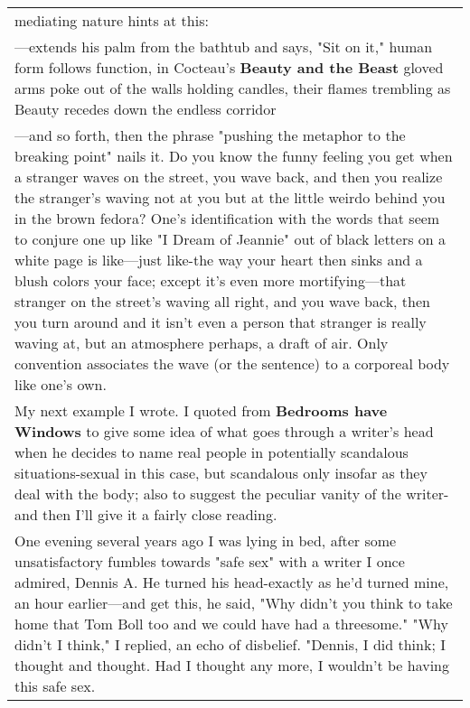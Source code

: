 \begin{longtable}[]{@{}l@{}}
\begin{minipage}[t]{0.97\columnwidth}
mediating nature hints at this:\strut
\end{minipage}\tabularnewline
\begin{minipage}[t]{0.97\columnwidth}\raggedright
---extends his palm from the bathtub and says, "Sit on it," human form
follows function, in Cocteau's \textbf{Beauty and the Beast} gloved arms
poke out of the walls holding candles, their flames trembling as Beauty
recedes down the endless corridor\strut
\end{minipage}\tabularnewline
\begin{minipage}[t]{0.97\columnwidth}\raggedright
---and so forth, then the phrase "pushing the metaphor to the breaking
point" nails it. Do you know the funny feeling you get when a stranger
waves on the street, you wave back, and then you realize the stranger's
waving not at you but at the little weirdo behind you in the brown
fedora? One's identification with the words that seem to conjure one up
like "I Dream of Jeannie" out of black letters on a white page is
like---just like-the way your heart then sinks and a blush colors your
face; except it's even more mortifying---that stranger on the street's
waving all right, and you wave back, then you turn around and it isn't
even a person that stranger is really waving at, but an atmosphere
perhaps, a draft of air. Only convention associates the wave (or the
sentence) to a corporeal body like one's own.\strut
\end{minipage}\tabularnewline
\begin{minipage}[t]{0.97\columnwidth}\raggedright
My next example I wrote. I quoted from \textbf{Bedrooms have Windows} to
give some idea of what goes through a writer's head when he decides to
name real people in potentially scandalous situations-sexual in this
case, but scandalous only insofar as they deal with the body; also to
suggest the peculiar vanity of the writer-and then I'll give it a fairly
close reading.\strut
\end{minipage}\tabularnewline
\begin{minipage}[t]{0.97\columnwidth}\raggedright
One evening several years ago I was lying in bed, after some
unsatisfactory fumbles towards "safe sex" with a writer I once admired,
Dennis A. He turned his head-exactly as he'd turned mine, an hour
earlier---and get this, he said, "Why didn't you think to take home that
Tom Boll too and we could have had a threesome." "Why didn't I think," I
replied, an echo of disbelief. "Dennis, I did think; I thought and
thought. Had I thought any more, I wouldn't be having this safe sex.

\end{minipage}
\end{longtable}
